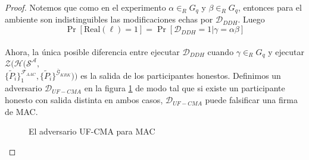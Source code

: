 \begin{proof}
Notemos que como en el experimento $\alpha \in_{R} G_q$ y $\beta \in_{R} G_q$, entonces para el ambiente
son indistinguibles las modificaciones echas por $\mathcal{D}_{DDH}$. Luego
\begin{equation}
\Pr[\mathrm{Real}(\ell) = 1] = \Pr[\mathcal{D}_{DDH} = 1|\gamma = \alpha\beta]
\label{eq:ddh_1}
\end{equation}\\
Ahora, la única posible diferencia entre ejecutar $\mathcal{D}_{DDH}$ cuando $\gamma \in_R G_q$ y ejecutar
$
\mathcal{Z}(
    \mathcal{H}(
        \mathcal{S^A},$\\$
        \{\tilde{P}_i\}_1^{\mathcal{F}_{AAC}},
        \{\tilde{P}_i\}^{\bar{\mathcal{G}}_{KRK}}))
$
es la salida de los participantes honestos. Definimos un adversario $\mathcal{D}_{UF-CMA}$ en la figura
\ref{adv:uf-cma} de modo tal que si existe un participante honesto con salida distinta en ambos casos,
$\mathcal{D}_{UF-CMA}$ puede
falsificar una firma de MAC.

\begin{figure}
\caption{El adversario UF-CMA para MAC}
\label{adv:uf-cma}
\end{figure}


\end{proof}
